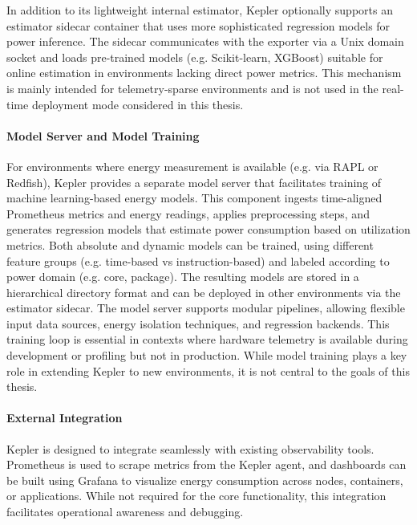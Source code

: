 In addition to its lightweight internal estimator, Kepler optionally supports an estimator sidecar container that uses more sophisticated regression models for power inference. The sidecar communicates with the exporter via a Unix domain socket and loads pre-trained models (e.g. Scikit-learn, XGBoost) suitable for online estimation in environments lacking direct power metrics. This mechanism is mainly intended for telemetry-sparse environments and is not used in the real-time deployment mode considered in this thesis.

\paragraph{Model Server and Model Training}

For environments where energy measurement is available (e.g. via RAPL or Redfish), Kepler provides a separate model server that facilitates training of machine learning-based energy models. This component ingests time-aligned Prometheus metrics and energy readings, applies preprocessing steps, and generates regression models that estimate power consumption based on utilization metrics. Both absolute and dynamic models can be trained, using different feature groups (e.g. time-based vs instruction-based) and labeled according to power domain (e.g. core, package). The resulting models are stored in a hierarchical directory format and can be deployed in other environments via the estimator sidecar. The model server supports modular pipelines, allowing flexible input data sources, energy isolation techniques, and regression backends. This training loop is essential in contexts where hardware telemetry is available during development or profiling but not in production. While model training plays a key role in extending Kepler to new environments\parencite{choochotkaewAdvancingCloudSustainability2023}, it is not central to the goals of this thesis.

\paragraph{External Integration}

Kepler is designed to integrate seamlessly with existing observability tools. Prometheus is used to scrape metrics from the Kepler agent, and dashboards can be built using Grafana to visualize energy consumption across nodes, containers, or applications. While not required for the core functionality, this integration facilitates operational awareness and debugging.

